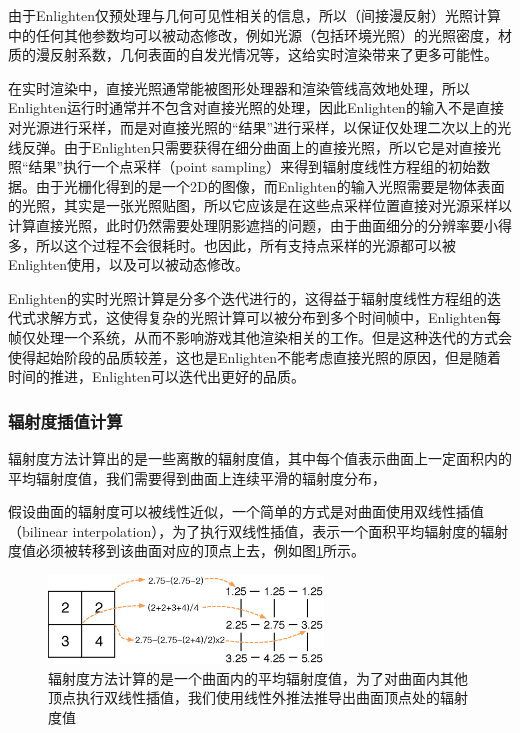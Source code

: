 由于Enlighten仅预处理与几何可见性相关的信息，所以（间接漫反射）光照计算中的任何其他参数均可以被动态修改，例如光源（包括环境光照）的光照密度，材质的漫反射系数，几何表面的自发光情况等，这给实时渲染带来了更多可能性。

在实时渲染中，直接光照通常能被图形处理器和渲染管线高效地处理，所以Enlighten运行时通常并不包含对直接光照的处理，因此Enlighten的输入不是直接对光源进行采样，而是对直接光照的“结果”进行采样，以保证仅处理二次以上的光线反弹。由于Enlighten只需要获得在细分曲面上的直接光照，所以它是对直接光照“结果”执行一个点采样（point sampling）来得到辐射度线性方程组的初始数据。由于光栅化得到的是一个2D的图像，而Enlighten的输入光照需要是物体表面的光照，其实是一张光照贴图，所以它应该是在这些点采样位置直接对光源采样以计算直接光照，此时仍然需要处理阴影遮挡的问题，由于曲面细分的分辨率要小得多，所以这个过程不会很耗时。也因此，所有支持点采样的光源都可以被Enlighten使用，以及可以被动态修改。

Enlighten的实时光照计算是分多个迭代进行的，这得益于辐射度线性方程组的迭代式求解方式，这使得复杂的光照计算可以被分布到多个时间帧中，Enlighten每帧仅处理一个系统，从而不影响游戏其他渲染相关的工作。但是这种迭代的方式会使得起始阶段的品质较差，这也是Enlighten不能考虑直接光照的原因，但是随着时间的推进，Enlighten可以迭代出更好的品质。




\subsubsection{辐射度插值计算}
辐射度方法计算出的是一些离散的辐射度值，其中每个值表示曲面上一定面积内的平均辐射度值，我们需要得到曲面上连续平滑的辐射度分布，

假设曲面的辐射度可以被线性近似，一个简单的方式是对曲面使用双线性插值（bilinear interpolation），为了执行双线性插值，表示一个面积平均辐射度的辐射度值必须被转移到该曲面对应的顶点上去，例如图\ref{f:r-linear-extrapolation}所示。

\begin{figure}
\sidecaption
\includegraphics[width=0.65\textwidth]{figures/r/linear-extrapolation}
	\caption{辐射度方法计算的是一个曲面内的平均辐射度值，为了对曲面内其他顶点执行双线性插值，我们使用线性外推法推导出曲面顶点处的辐射度值}
	\label{f:r-linear-extrapolation}
\end{figure}

